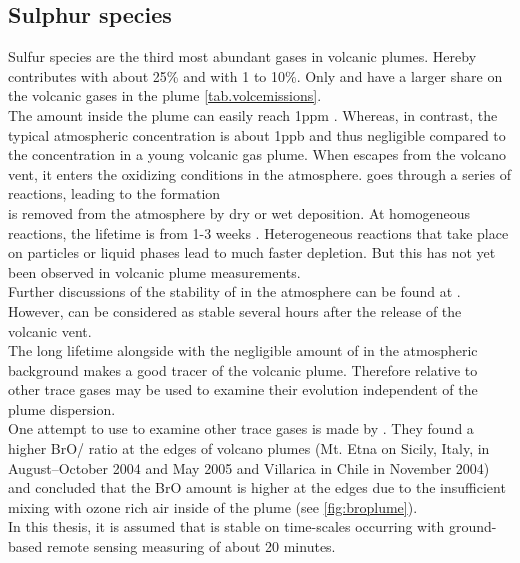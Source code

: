 \documentclass  [
  paper    = a4,
  BCOR     = 10mm,
  twoside,
  fontsize = 12pt,
  fleqn,
  toc      = bibnumbered,
  toc      = listofnumbered,
  numbers  = noendperiod,
  headings = normal,
  listof   = leveldown,
  version  = 3.03
]                                       {scrreprt}
\begin{document}
\subsection{Sulphur species\label{chap:so2}}
Sulfur species are the third most abundant gases in volcanic plumes. Hereby  contributes with about 25\% and  with 1 to 10\%. Only  and  have a larger share on the volcanic gases in the plume \cref{tab.volcemissions}.\\
The   amount inside the plume can easily reach 1ppm \citep{oppenheimer2003volcanic}. Whereas, in contrast, the typical atmospheric concentration is about 1ppb and thus negligible compared to the concentration in a young volcanic gas plume.
When  escapes from the volcano vent, it enters the oxidizing conditions in the atmosphere.  goes through a series of reactions, leading to the  formation \citep{seinfeld2016atmospheric}\\
 is removed from the atmosphere by dry or wet
deposition. At homogeneous reactions, the lifetime is from 1-3 weeks \citep{robock2000volcanic}. Heterogeneous reactions that take place on particles or liquid phases lead to much faster depletion. But this has not yet been observed in volcanic plume measurements.\\
Further discussions of the stability of   in the atmosphere can be found at \citet{lubcke2014optical}.\\
However,  can be considered as stable several hours after the release of the volcanic vent.\\ The long lifetime alongside with the negligible amount of  in the atmospheric background makes  a good tracer of the volcanic plume.
Therefore relative to other trace gases  may be used to examine their evolution independent of the plume dispersion.\\
One attempt to use  to examine other trace gases is made by \citet{bobrowski2007reactive}. They found a higher BrO/ ratio at the edges of volcano plumes (Mt. Etna on Sicily, Italy, in August–October 2004 and May 2005 and Villarica in Chile in November 2004) and concluded that the BrO amount is higher at the edges due to the insufficient mixing with ozone rich air inside of the plume (see \cref{fig:broplume}).\\
In this thesis, it is assumed that   is stable on time-scales occurring with ground-based remote sensing measuring of about 20 minutes. \\
%
\end{document}
